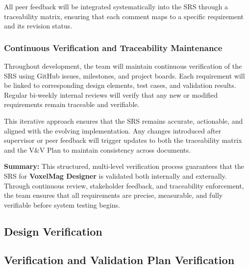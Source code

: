 \documentclass[12pt, titlepage]{article}
\begin{document}
All peer feedback will be integrated systematically into the SRS through a traceability matrix, ensuring that each comment maps to a specific requirement and its revision status.

\subsubsection{Continuous Verification and Traceability Maintenance}

Throughout development, the team will maintain continuous verification of the SRS using GitHub issues, milestones, and project boards. Each requirement will be linked to corresponding design elements, test cases, and validation results. Regular bi-weekly internal reviews will verify that any new or modified requirements remain traceable and verifiable.

This iterative approach ensures that the SRS remains accurate, actionable, and aligned with the evolving implementation. Any changes introduced after supervisor or peer feedback will trigger updates to both the traceability matrix and the V\&V Plan to maintain consistency across documents.

\textbf{Summary:} This structured, multi-level verification process guarantees that the SRS for \textbf{VoxelMag Designer} is validated both internally and externally. Through continuous review, stakeholder feedback, and traceability enforcement, the team ensures that all requirements are precise, measurable, and fully verifiable before system testing begins.

\subsection{Design Verification}




\subsection{Verification and Validation Plan Verification}


\end{document}

